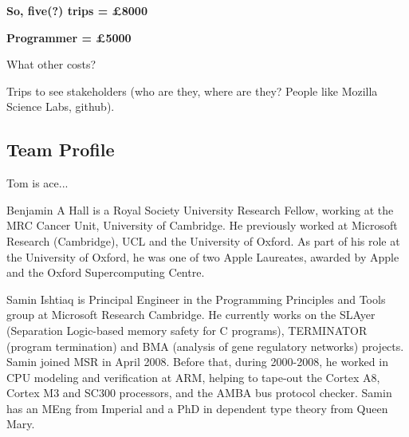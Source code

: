 \documentclass[a4paper,11pt]{article}
\begin{document}
{\textbf{So, five(?) trips = \pounds 8000}}

{\textbf{Programmer = \pounds 5000}}

What other costs?

Trips to see stakeholders (who are they, where are they? People like Mozilla Science Labs, github). 

\subsection*{Team Profile}


Tom is ace...

Benjamin A Hall is a Royal Society University Research Fellow, working at the MRC Cancer Unit, University of Cambridge. He previously worked at Microsoft Research (Cambridge), UCL and the University of Oxford. As part of his role at the University of Oxford, he was one of two Apple Laureates, awarded by Apple and the Oxford Supercomputing Centre.

Samin Ishtiaq is Principal Engineer in the Programming Principles and Tools group at Microsoft Research Cambridge. He currently works on the SLAyer (Separation Logic-based memory safety for C programs), TERMINATOR (program termination) and BMA (analysis of gene regulatory networks) projects. Samin joined MSR in April 2008. Before that, during 2000-2008, he worked in CPU modeling and verification at ARM, helping to tape-out the Cortex A8, Cortex M3 and SC300 processors, and the AMBA bus protocol checker. Samin has an MEng from Imperial and a PhD in dependent type theory from Queen Mary. 



\end{document}
